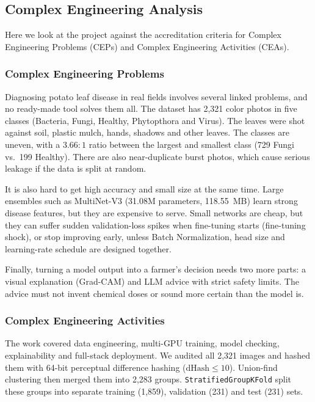 \subsection{Complex Engineering Analysis}
Here we look at the project against the accreditation criteria for Complex Engineering Problems (CEPs) and Complex Engineering Activities (CEAs).

\subsubsection{Complex Engineering Problems}
Diagnosing potato leaf disease in real fields involves several linked problems, and no ready-made tool solves them all. The dataset has 2,321 color photos in five classes (Bacteria, Fungi, Healthy, Phytopthora and Virus). The leaves were shot against soil, plastic mulch, hands, shadows and other leaves. The classes are uneven, with a $3.66:1$ ratio between the largest and smallest class (729 Fungi vs.\ 199 Healthy). There are also near-duplicate burst photos, which cause serious leakage if the data is split at random.

It is also hard to get high accuracy and small size at the same time. Large ensembles such as MultiNet-V3 (31.08M parameters, 118.55~MB) learn strong disease features, but they are expensive to serve. Small networks are cheap, but they can suffer sudden validation-loss spikes when fine-tuning starts (fine-tuning shock), or stop improving early, unless Batch Normalization, head size and learning-rate schedule are designed together.

Finally, turning a model output into a farmer's decision needs two more parts: a visual explanation (Grad-CAM) and LLM advice with strict safety limits. The advice must not invent chemical doses or sound more certain than the model is.

\subsubsection{Complex Engineering Activities}
The work covered data engineering, multi-GPU training, model checking, explainability and full-stack deployment. We audited all 2,321 images and hashed them with 64-bit perceptual difference hashing ($\text{dHash} \le 10$). Union-find clustering then merged them into 2,283 groups. \texttt{StratifiedGroupKFold} split these groups into separate training (1,859), validation (231) and test (231) sets.

